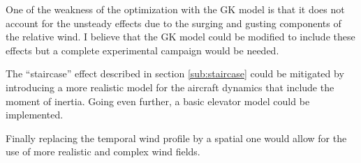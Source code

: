 
\par One of the weakness of the optimization with the GK model is that it does not account for the unsteady effects due to the surging and gusting components of the relative wind.
I believe that the GK model could be modified to include these effects but a complete experimental campaign would be needed.

\par The ``staircase'' effect described in section \ref{sub:staircase} could be mitigated by introducing a more realistic model for the aircraft dynamics that include the moment of inertia.
Going even further, a basic elevator model could be implemented.

\par Finally replacing the temporal wind profile by a spatial one would allow for the use of more realistic and complex wind fields.

